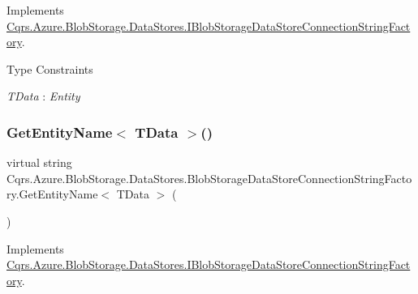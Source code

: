 Implements \hyperlink{interfaceCqrs_1_1Azure_1_1BlobStorage_1_1DataStores_1_1IBlobStorageDataStoreConnectionStringFactory_a7c86fb71e24cd75b848f67e6864689ae_a7c86fb71e24cd75b848f67e6864689ae}{Cqrs.\+Azure.\+Blob\+Storage.\+Data\+Stores.\+I\+Blob\+Storage\+Data\+Store\+Connection\+String\+Factory}.

\begin{Desc}
\item[Type Constraints]\begin{description}
\item[{\em T\+Data} : {\em Entity}]\end{description}
\end{Desc}
\mbox{\label{classCqrs_1_1Azure_1_1BlobStorage_1_1DataStores_1_1BlobStorageDataStoreConnectionStringFactory_a0ece7f48e0305b8397b95308dfdf2532_a0ece7f48e0305b8397b95308dfdf2532}} 
\subsubsection{\texorpdfstring{Get\+Entity\+Name$<$ T\+Data $>$()}{GetEntityName< TData >()}}
{\footnotesize\ttfamily virtual string Cqrs.\+Azure.\+Blob\+Storage.\+Data\+Stores.\+Blob\+Storage\+Data\+Store\+Connection\+String\+Factory.\+Get\+Entity\+Name$<$ T\+Data $>$ (\begin{DoxyParamCaption}{ }\end{DoxyParamCaption})\hspace{0.3cm}{\ttfamily [virtual]}}



Implements \hyperlink{interfaceCqrs_1_1Azure_1_1BlobStorage_1_1DataStores_1_1IBlobStorageDataStoreConnectionStringFactory_ad7f6480ea3fa6dfab0953f05c2c15f85_ad7f6480ea3fa6dfab0953f05c2c15f85}{Cqrs.\+Azure.\+Blob\+Storage.\+Data\+Stores.\+I\+Blob\+Storage\+Data\+Store\+Connection\+String\+Factory}.


